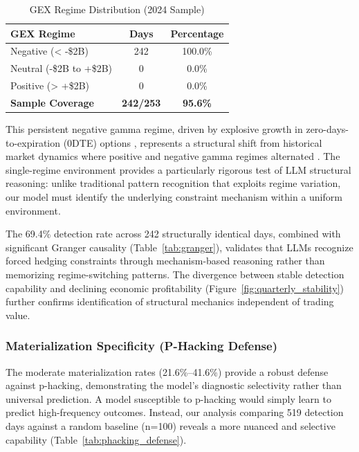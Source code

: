 \begin{table}[htbp]
\centering
\caption{GEX Regime Distribution (2024 Sample)}
\label{tab:gex_regime}
\begin{tabular}{lcc}
\toprule
GEX Regime & Days & Percentage \\
\midrule
Negative (< -\$2B) & 242 & 100.0\% \\
Neutral (-\$2B to +\$2B) & 0 & 0.0\% \\
Positive (> +\$2B) & 0 & 0.0\% \\
\midrule
\textbf{Sample Coverage} & \textbf{242/253} & \textbf{95.6\%} \\
\bottomrule
\end{tabular}
\end{table}

This persistent negative gamma regime, driven by explosive growth in zero-days-to-expiration (0DTE) options \cite{cboe2023,jpmorgan2023}, represents a structural shift from historical market dynamics where positive and negative gamma regimes alternated \cite{ni2005stock,garleanu2009demand}. The single-regime environment provides a particularly rigorous test of LLM structural reasoning: unlike traditional pattern recognition that exploits regime variation, our model must identify the underlying constraint mechanism within a uniform environment.

The 69.4\% detection rate across 242 structurally identical days, combined with significant Granger causality (Table~\ref{tab:granger}), validates that LLMs recognize forced hedging constraints through mechanism-based reasoning rather than memorizing regime-switching patterns. The divergence between stable detection capability and declining economic profitability (Figure~\ref{fig:quarterly_stability}) further confirms identification of structural mechanics independent of trading value.

\subsubsection{Materialization Specificity (P-Hacking Defense)}

The moderate materialization rates (21.6\%--41.6\%) provide a robust defense against p-hacking, demonstrating the model's diagnostic selectivity rather than universal prediction. A model susceptible to p-hacking would simply learn to predict high-frequency outcomes. Instead, our analysis comparing 519 detection days against a random baseline (n=100) reveals a more nuanced and selective capability (Table~\ref{tab:phacking_defense}).

